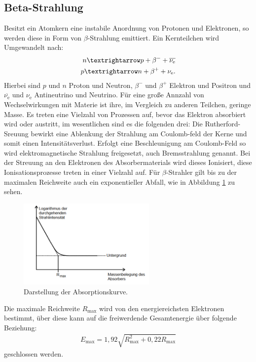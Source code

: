 \subsection{Beta-Strahlung}
Besitzt ein Atomkern eine instabile Anordnung von Protonen und Elektronen, so werden diese in Form von $\beta$-Strahlung
emittiert. Ein Kernteilchen wird Umgewandelt nach:
\begin{align}
n \textrightarrow p+\beta^- +\overline{\nu_\mathrm{e}}\\
p \textrightarrow n+\beta^+ +\nu_\mathrm{e}.
\end{align}
Hierbei sind $p$ und $n$ Proton und Neutron, $\beta^-$ und $\beta^+$ Elektron und Positron und $\overline{\nu_\mathrm{e}}$ und $\nu_\mathrm{e}$ Antineutrino und Neutrino.
Für eine große Annzahl von Wechselwirkungen mit Materie ist ihre, im Vergleich zu anderen Teilchen, geringe Masse.
Es treten eine Vielzahl von Prozessen auf, bevor das Elektron absorbiert wird oder austritt, im wesentlichen
sind es die folgenden drei: Die Rutherford-Sreuung bewirkt eine Ablenkung der Strahlung am Coulomb-feld der Kerne
und somit einen Intensitätsverlust. Erfolgt eine Beschleunigung am Coulomb-Feld so wird elektromagnetische
Strahlung freigesetzt, auch Bremsstrahlung genannt. Bei der Streuung an den Elektronen des Absorbermaterials
wird dieses Ionisiert, diese Ionisationsprozesse treten in einer Vielzahl auf.
Für $\beta$-Strahler gilt bis zu der maximalen Reichweite auch ein exponentieller Abfall, wie in Abbildung \ref{fig:abf}
zu sehen.
\begin{figure}
  \centering
  \includegraphics[width=0.6\textwidth]{abf.PNG}
  \caption{Darstellung der Absorptionskurve.}
  \label{fig:abf}
\end{figure}
Die maximale Reichweite $R_\mathrm{max}$ wird von den energiereichsten Elektronen bestimmt, über diese kann
auf die freiwerdende Gesamtenergie über folgende Beziehung:
\begin{align}
E_\mathrm{max}=1,92\sqrt{R^2_\mathrm{max}+0,22R_\mathrm{max}}\label{eqn:emax}
\end{align}
geschlossen werden.
